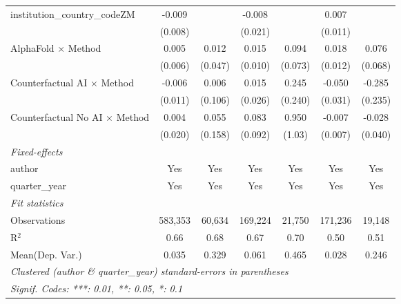 \begin{tabular}{lcccccc}
   institution\_country\_codeZM          & -0.009         &               & -0.008        &              & 0.007        &   \\   
                                         & (0.008)        &               & (0.021)       &              & (0.011)      &   \\   
   AlphaFold $\times$ Method             & 0.005          & 0.012         & 0.015         & 0.094        & 0.018        & 0.076\\   
                                         & (0.006)        & (0.047)       & (0.010)       & (0.073)      & (0.012)      & (0.068)\\   
   Counterfactual AI $\times$ Method     & -0.006         & 0.006         & 0.015         & 0.245        & -0.050       & -0.285\\   
                                         & (0.011)        & (0.106)       & (0.026)       & (0.240)      & (0.031)      & (0.235)\\   
   Counterfactual No AI $\times$ Method  & 0.004          & 0.055         & 0.083         & 0.950        & -0.007       & -0.028\\   
                                         & (0.020)        & (0.158)       & (0.092)       & (1.03)       & (0.007)      & (0.040)\\   
   \midrule
   \emph{Fixed-effects}\\
   author                                & Yes            & Yes           & Yes           & Yes          & Yes          & Yes\\  
   quarter\_year                         & Yes            & Yes           & Yes           & Yes          & Yes          & Yes\\  
   \midrule
   \emph{Fit statistics}\\
   Observations                          & 583,353        & 60,634        & 169,224       & 21,750       & 171,236      & 19,148\\  
   R$^2$                                 & 0.66           & 0.68          & 0.67          & 0.70         & 0.50         & 0.51\\  
Mean(Dep. Var.) & 0.035 & 0.329 & 0.061 & 0.465 & 0.028 & 0.246 \\
   \midrule \midrule
   \multicolumn{7}{l}{\emph{Clustered (author \& quarter\_year) standard-errors in parentheses}}\\
   \multicolumn{7}{l}{\emph{Signif. Codes: ***: 0.01, **: 0.05, *: 0.1}}\\
\end{tabular}
\par\endgroup
